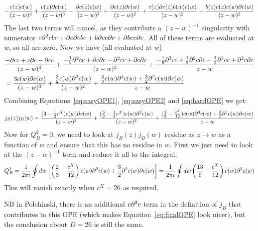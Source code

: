 \documentclass[11pt]{article}
\begin{document}
\begin{enumerate}
\begin{equation}
\begin{aligned}
			-\frac{c(z) c(w)}{(z-w)^4} + \frac{c(z) \partial c (w)}{(z-w)^3} - \frac{\partial c(z) c(w)}{(z-w)^3} + \frac{\partial c(z) \partial c(w)}{(z-w)^2} + \frac{c(z) \partial c(z) b(w) c(w)}{(z-w)^2} + \frac{b(z) c(z) c(w) \partial c(w)}{(z-w)^2}
		\end{aligned}
	\end{equation} 
	The last two terms will cancel, as they contribute a $(z-w)^{-1}$ singularity with numerator $c \partial^2 c b c + \partial c \partial c b c + b \partial c c \partial c + \partial b c c \partial c$. All of these terms are evaluated at $w$, so all are zero. Now we have (all evaluated at $w$)
	\begin{equation}\label{eq:hardOPE}
		\begin{aligned}
			&\frac{-\partial c c + c \partial c - \partial c c}{(z-w)^3} + \frac{-\frac12 \partial^2 c c + \partial c \partial c - \partial^2 c c + \partial c \partial c}{(z-w)^2} + \frac{-\frac16 \partial^3 c c + \frac12 \partial^2 c \partial c - \frac12 \partial^3 c c + \partial^2 c \partial c }{z - w}\\
			&= \frac{3 c(w) \partial c(w)}{(z-w)^3} + \frac{\frac32 c(w) \partial^2 c(w)}{(z-w)^2} + \frac{\frac23 c(w) \partial^3 c(w) + \frac32 \partial^2 c(w) \partial c(w)}{z-w}
		\end{aligned}
	\end{equation}
	Combining Equations~\eqref{eq:easyOPE1}, \eqref{eq:easyOPE2} and  \eqref{eq:hardOPE} we get:
	\begin{equation}\label{eq:finalOPE}
				j_B(z) j_B(w) = \frac{(3 - \frac12 c^X) c(w) \partial c(w)}{(z-w)^3} + \frac{(\frac32 - \frac14 c^X) c(w) \partial^2 c(w)}{(z-w)^2} + \frac{(\frac23 - \frac{c^X}{12}) c(w) \partial^3 c(w) + \frac32 \partial^2 c(w) \partial c(w)}{z-w}
	\end{equation}
	Now for $Q_B^2 = 0$, we need to look at $j_B(z) j_B(w)$ residue as $z \to w$ as a function of $w$ and ensure that this has no residue in $w$. First we just need to look at the $(z-w)^{-1}$ term and reduce it all to the integral:
	\[
		Q_B^2 = \frac{1}{2\pi i} \oint dw \left[\left(\frac23 - \frac{c^X}{12}\right) c(w) \partial^3 c(w) + \frac32 \partial^2 c(w) \partial c(w)\right] = \frac{1}{2\pi i} \oint dw \left(\frac{13}{6} - \frac{c^X}{12}\right) c(w) \partial^3 c(w)
	\]
	This will vanish exactly when $c^X = 26$ as required. 
	
	NB in Polchinski, there is an additional $c \partial^3 c$ term in the definition of $j_B$ that contributes to this OPE (which makes Equation~\eqref{eq:finalOPE} look nicer), but the conclusion about $D = 26$ is still the same. 
	

\end{enumerate}
\end{document}
